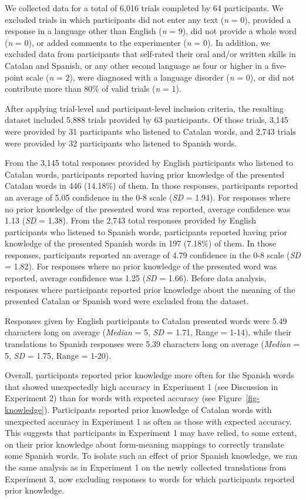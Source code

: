 \documentclass[
  man,
  longtable,
  nolmodern,
  notxfonts,
  notimes,
  colorlinks=true,linkcolor=blue,citecolor=blue,urlcolor=blue]{apa7}
\begin{document}
We collected data for a total of 6,016 trials completed by 64
participants. We excluded trials in which participants did not enter any
text (\emph{n} = 0), provided a response in a language other than
English (\emph{n} = 9), did not provide a whole word (\emph{n} = 0), or
added comments to the experimenter (\emph{n} = 0). In addition, we
excluded data from participants that self-rated their oral and/or
written skills in Catalan and Spanish, or any other second language as
four or higher in a five-point scale (\emph{n} = 2), were diagnosed with
a language disorder (\emph{n} = 0), or did not contribute more than 80\%
of valid trials (\emph{n} = 1).

After applying trial-level and participant-level inclusion criteria, the
resulting dataset included 5,888 trials provided by 63 participants. Of
those trials, 3,145 were provided by 31 participants who listened to
Catalan words, and 2,743 trials were provided by 32 participants who
listened to Spanish words.

From the 3,145 total responses provided by English participants who
listened to Catalan words, participants reported having prior knowledge
of the presented Catalan words in 446 (14.18\%) of them. In those
responses, participants reported an average of 5.05 confidence in the
0-8 scale (\emph{SD} = 1.94). For responses where no prior knowledge of
the presented word was reported, average confidence was 1.13 (\emph{SD}
= 1.38). From the 2,743 total responses provided by English participants
who listened to Spanish words, participants reported having prior
knowledge of the presented Spanish words in 197 (7.18\%) of them. In
those responses, participants reported an average of 4.79 confidence in
the 0-8 scale (\emph{SD} = 1.82). For responses where no prior knowledge
of the presented word was reported, average confidence was 1.25
(\emph{SD} = 1.66). Before data analysis, responses where participants
reported prior knowledge about the meaning of the presented Catalan or
Spanish word were excluded from the dataset.

Responses given by English participants to Catalan presented words were
5.49 characters long on average (\emph{Median} = 5, \emph{SD} = 1.71,
Range = 1-14), while their translations to Spanish responses were 5.39
characters long on average (\emph{Median} = 5, \emph{SD} = 1.75, Range =
1-20).

Overall, participants reported prior knowledge more often for the
Spanish words that showed unexpectedly high accuracy in Experiment 1
(see Discussion in Experiment 2) than for words with expected accuracy
(see Figure~\ref{fig-knowledge}). Participants reported prior knowledge
of Catalan words with unexpected accuracy in Experiment 1 as often as
those with expected accuracy. This suggests that participants in
Experiment 1 may have relied, to some extent, on their prior knowledge
about form-meaning mappings to correctly translate some Spanish words.
To isolate such an effect of prior Spanish knowledge, we ran the same
analysis as in Experiment 1 on the newly collected translations from
Experiment 3, now excluding responses to words for which participants
reported prior knowledge.
\end{document}
